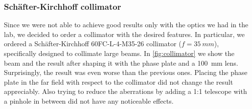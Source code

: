 \subsubsection{Schäfter-Kirchhoff collimator}
Since we were not able to achieve good results only with the optics we had in the lab, we decided to order a collimator with the desired features. In particular, we ordered a Schäfter-Kirchhoff 60FC-L-4-M35-26 collimator ($f = \SI{35}{mm}$), specifically designed to collimate large beams. In \cref{fig:collimator} we show the beam and the result after shaping it with the phase plate and a \SI{100}{mm} lens. Surprisingly, the result was even worse than the previous ones. Placing the phase plate in the far field with respect to the collimator did not change the result appreciably. Also trying to reduce the aberrations by adding a 1:1 telescope with a pinhole in between did not have any noticeable effects.

